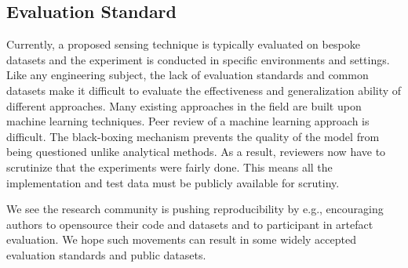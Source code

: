 
\subsection{Evaluation Standard}
Currently, a proposed sensing technique is typically evaluated on bespoke datasets and the experiment is conducted in specific environments
and settings. Like any engineering subject, the lack of evaluation standards and common datasets make it difficult to evaluate the
effectiveness and generalization ability of different approaches. Many existing approaches in the field are built upon machine learning
techniques. Peer review of a machine learning approach is difficult. The black-boxing mechanism prevents the quality of the model from
being questioned unlike analytical methods. As a result, reviewers now have to scrutinize that the experiments were fairly done. This means
all the implementation and test data must be publicly available for scrutiny.

We see the research community is pushing reproducibility by e.g., encouraging authors to opensource their code and datasets and to
participant in artefact evaluation. We hope such movements can result in some widely accepted evaluation standards and public datasets.


